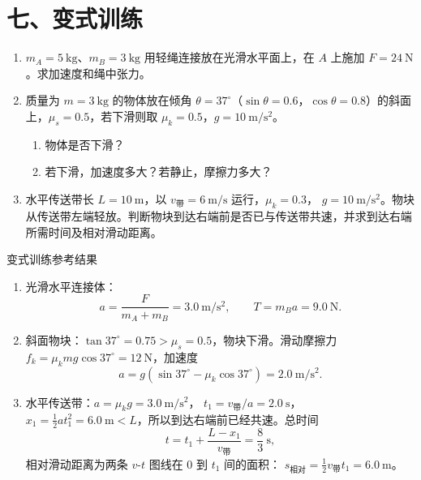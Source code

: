 \section*{七、变式训练}

\begin{enumerate}[itemsep=0.65em,topsep=0.4em,parsep=0pt]
  \item $m_A = 5\ \mathrm{kg}$、$m_B = 3\ \mathrm{kg}$ 用轻绳连接放在光滑水平面上，在 $A$ 上施加 $F = 24\ \mathrm{N}$。求加速度和绳中张力。

  \item 质量为 $m = 3\ \mathrm{kg}$ 的物体放在倾角 $\theta = 37^\circ$（$\sin\theta = 0.6$，$\cos\theta = 0.8$）的斜面上，$\mu_s = 0.5$，若下滑则取 $\mu_k = 0.5$，$g = 10\ \mathrm{m/s^2}$。
  \begin{enumerate}[itemsep=0.35em,topsep=0.25em,parsep=0pt]
    \item 物体是否下滑？
    \item 若下滑，加速度多大？若静止，摩擦力多大？
  \end{enumerate}

  \item 水平传送带长 $L = 10\ \mathrm{m}$，以
  $v_{\text{带}} = 6\ \mathrm{m/s}$ 运行，$\mu_k = 0.3$，
  $g = 10\ \mathrm{m/s^2}$。物块从传送带左端轻放。判断物块到达右端前是否已与传送带共速，并求到达右端所需时间及相对滑动距离。
  \begin{center}
  
  \end{center}
\end{enumerate}

\begin{learningbox}{变式训练参考结果}
\begin{enumerate}[itemsep=0.45em,topsep=0.3em,parsep=0pt]
  \item 光滑水平连接体：
  \[
  a=\frac{F}{m_A+m_B}=3.0\ \mathrm{m/s^2},
  \qquad
  T=m_Ba=9.0\ \mathrm{N}.
  \]

  \item 斜面物块：$\tan37^\circ=0.75>\mu_s=0.5$，物块下滑。滑动摩擦力
  $f_k=\mu_kmg\cos37^\circ=12\ \mathrm{N}$，加速度
  \[
  a=g(\sin37^\circ-\mu_k\cos37^\circ)
   =2.0\ \mathrm{m/s^2}.
  \]

  \item 水平传送带：$a=\mu_kg=3.0\ \mathrm{m/s^2}$，
  $t_1=v_{\text{带}}/a=2.0\ \mathrm{s}$，
  $x_1=\frac12at_1^2=6.0\ \mathrm{m}<L$，所以到达右端前已经共速。总时间
  \[
  t=t_1+\frac{L-x_1}{v_{\text{带}}}
   =\frac83\ \mathrm{s},
  \]
  相对滑动距离为两条 $v$-$t$ 图线在 $0$ 到 $t_1$ 间的面积：
  $s_{\text{相对}}=\frac12v_{\text{带}}t_1=6.0\ \mathrm{m}$。
\end{enumerate}
\end{learningbox}

